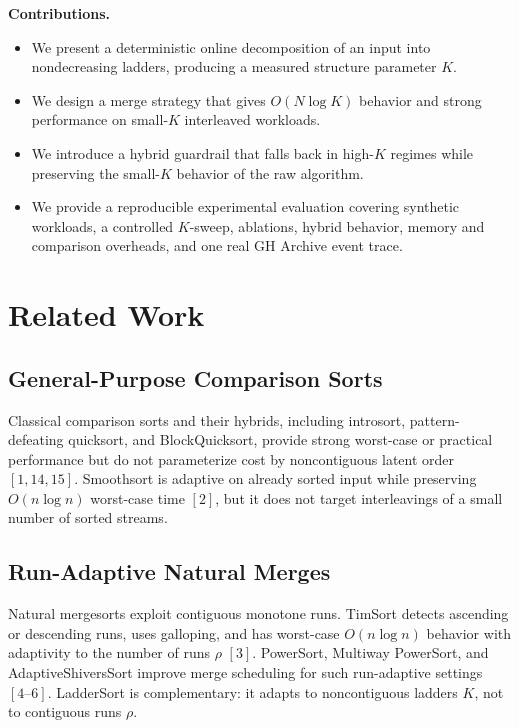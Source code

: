 \documentclass[10pt]{article}
\begin{document}
\noindent\textbf{Contributions.}
\begin{itemize}
\item We present a deterministic online decomposition of an input into nondecreasing ladders, producing a measured structure parameter \(K\).
\item We design a merge strategy that gives \(O(N\log K)\) behavior and strong performance on small-\(K\) interleaved workloads.
\item We introduce a hybrid guardrail that falls back in high-\(K\) regimes while preserving the small-\(K\) behavior of the raw algorithm.
\item We provide a reproducible experimental evaluation covering synthetic workloads, a controlled \(K\)-sweep, ablations, hybrid behavior, memory and comparison overheads, and one real GH Archive event trace.
\end{itemize}

\clearpage

\section{Related Work}\label{related-work}

\subsection{General-Purpose Comparison Sorts}\label{general-purpose-comparison-sorts}

Classical comparison sorts and their hybrids, including introsort, pattern-defeating quicksort, and BlockQuicksort, provide strong worst-case or practical performance but do not parameterize cost by noncontiguous latent order \([1,14,15]\). Smoothsort is adaptive on already sorted input while preserving \(O(n\log n)\) worst-case time \([2]\), but it does not target interleavings of a small number of sorted streams.

\subsection{Run-Adaptive Natural Merges}\label{run-adaptive-natural-merges}

Natural mergesorts exploit contiguous monotone runs. TimSort detects ascending or descending runs, uses galloping, and has worst-case \(O(n\log n)\) behavior with adaptivity to the number of runs \(\rho\) \([3]\). PowerSort, Multiway PowerSort, and AdaptiveShiversSort improve merge scheduling for such run-adaptive settings \([4\text{--}6]\). LadderSort is complementary: it adapts to noncontiguous ladders \(K\), not to contiguous runs \(\rho\).
\end{document}
